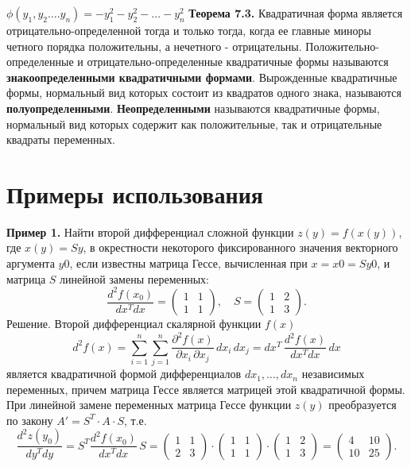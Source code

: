 \documentclass[bachelor, och, coursework, times]{SCWorks}
\newcommand\tab[1][1cm]{\hspace*{#1}}
\newcommand{\tl}{\newline\tab}
\begin{document}
$\phi(y_1,y_2….y_n)= -y_{1}^2-y_{2}^2 -…- y_{n}^2$
\tl
\textbf{Теорема 7.3.} Квадратичная форма является отрицательно-определенной тогда и только тогда, когда ее главные миноры четного порядка положительны, а нечетного - отрицательны.
\tl
Положительно-определенные и отрицательно-определенные квадратичные формы называются \textbf{знакоопределенными квадратичными формами}.
\tl
Вырожденные квадратичные формы, нормальный вид которых состоит из квадратов одного знака, называются \textbf{полуопределенными}. \textbf{Неопределенными} называются квадратичные формы, нормальный вид которых содержит как положительные, так и отрицательные квадраты переменных.

\section{Примеры использования}
\tab \textbf{Пример 1.} Найти второй дифференциал сложной функции $z(y)=f(x(y))$, где $x(y)=Sy$, в окрестности некоторого фиксированного значения векторного аргумента $y0$, если известны матрица Гессе, вычисленная при $x=x0=Sy0$, и матрица $S$
линейной замены переменных:
$$\frac{d^2f(x_0)}{dx^Tdx}
=\begin{pmatrix}
1&1\\
1&1
\end{pmatrix}\!,\quad 
S=
\begin{pmatrix}
1&2\\
1&3
\end{pmatrix}\!.$$
Решение. Второй дифференциал скалярной функции $f(x)$
$$d^2f(x)=\sum_{i=1}^{n}\sum_{j=1}^{n}\frac{\partial^2f(x)}{\partial x_i\,\partial x_j}\,dx_i\,dx_j= dx^T\,\frac{d^2f(x)}{dx^Tdx}\,dx$$
является квадратичной формой дифференциалов $dx_1,…,dx_n$
независимых переменных, причем матрица Гессе является матрицей этой квадратичной формы. При линейной замене переменных матрица Гессе функции $z(y)$ преобразуется по закону $A'=S^T\cdot A\cdot S$, т.е.
$$\frac{d^2z(y_0)}{dy^Tdy}= S^T\frac{d^2f(x_0)}{dx^Tdx}\,S= \begin{pmatrix}
1&1\\
2&3
\end{pmatrix}\!\cdot\! 
\begin{pmatrix}
1&1\\
1&1
\end{pmatrix}\!\cdot\! 
\begin{pmatrix} 
1&2\\
1&3
\end{pmatrix} = 
\begin{pmatrix} 
4&10\\
10&25
\end{pmatrix}\!.$$
\end{document}
